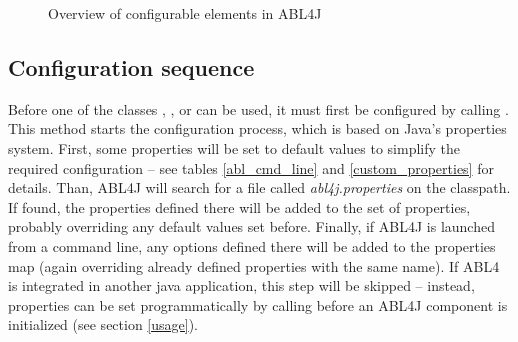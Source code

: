 \documentclass[12pt,a4paper]{article}
\newcommand{\code}[1]{{\ttfamily\selectfont{#1}}}
\begin{document}
\begin{landscape}
\begin{figure}[htb]
  \centering
  \caption{Overview of configurable elements in ABL4J}
  \label{init_img} 
\end{figure} 
\end{landscape}

\subsection{Configuration sequence}

Before one of the classes \code{Align}, \code{Cluster}, or \code{Select} can be
used, it must first be configured by calling \code{configure(PropertiesMap map)}.
This method starts the configuration process, which is based on Java's properties
system. First, some properties will be set to default values to simplify the
required configuration -- see tables \ref{abl_cmd_line} and
\ref{custom_properties} for details. Than, ABL4J will search for a file called
\emph{abl4j.properties} on the classpath. If found, the properties defined there
will be added to the set of properties, probably overriding any default values
set before. Finally, if ABL4J is launched from a command line, any options
defined there will be added to the properties map (again overriding already
defined properties with the same name). If ABL4 is integrated in another java
application, this step will be skipped -- instead, properties can be set
programmatically by calling \code{PropertiesMap.put(String key, String value)}
before an ABL4J component is initialized (see section \ref{usage}).
\end{document}

